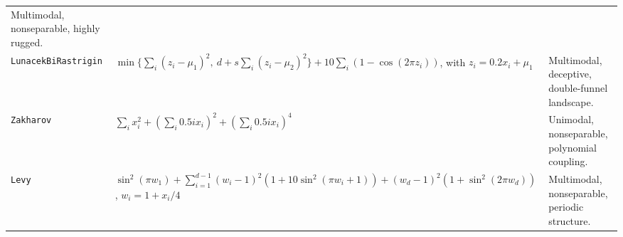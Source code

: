 \documentclass[journal]{IEEEtran}
\theoremstyle{remark}
\theoremstyle{plain}
\begin{document}
\begin{longtable}{@{}p{}p{}p{}@{}}
	Multimodal, nonseparable, highly rugged. \\
	\texttt{LunacekBiRastrigin} &
	\(\min\{\sum_i(z_i-\mu_1)^2,\ d+s\sum_i(z_i-\mu_2)^2\}
	+10\sum_i(1-\cos(2\pi z_i))\), with \(z_i=0.2x_i+\mu_1\) &
	Multimodal, deceptive, double-funnel landscape. \\
	\texttt{Zakharov} &
	\(\sum_i x_i^2+\left(\sum_i 0.5ix_i\right)^2
	+\left(\sum_i 0.5ix_i\right)^4\) &
	Unimodal, nonseparable, polynomial coupling. \\
	\texttt{Levy} &
	\(\sin^2(\pi w_1)+\sum_{i=1}^{d-1}(w_i-1)^2
	(1+10\sin^2(\pi w_i+1))+(w_d-1)^2(1+\sin^2(2\pi w_d))\),
	\(w_i=1+x_i/4\) &
	Multimodal, nonseparable, periodic structure. \\
\end{longtable}
\endgroup
\end{document}
